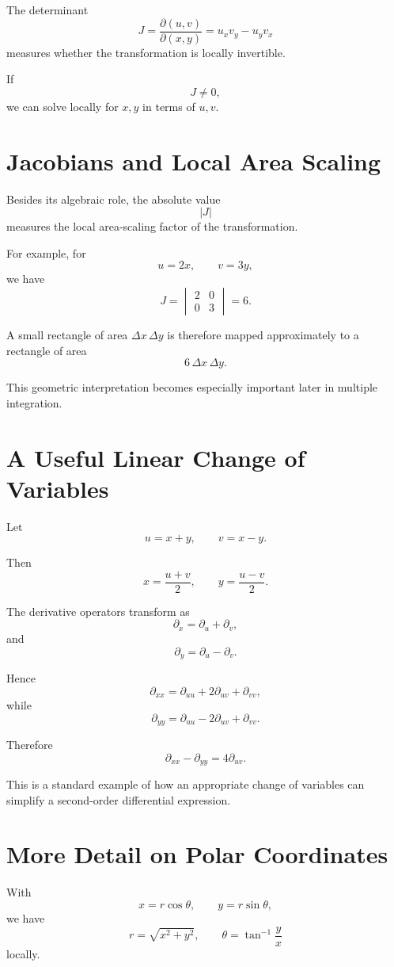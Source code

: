 \documentclass[11pt,oneside]{book}
\theoremstyle{studentthm}
\theoremstyle{definition}
\begin{document}
The determinant
\[
J
=
\frac{\partial(u,v)}{\partial(x,y)}
=
u_xv_y-u_yv_x
\]
measures whether the transformation is locally invertible.

If
\[
J\ne0,
\]
we can solve locally for \(x,y\) in terms of \(u,v\).

\section{Jacobians and Local Area Scaling}

Besides its algebraic role, the absolute value
\[
|J|
\]
measures the local area-scaling factor of the transformation.

For example, for
\[
u=2x,\qquad v=3y,
\]
we have
\[
J
=
\begin{vmatrix}
2&0\\
0&3
\end{vmatrix}
=6.
\]

A small rectangle of area \(\Delta x\,\Delta y\) is therefore mapped
approximately to a rectangle of area
\[
6\,\Delta x\,\Delta y.
\]

This geometric interpretation becomes especially important later in
multiple integration.

\section{A Useful Linear Change of Variables}

Let
\[
u=x+y,\qquad v=x-y.
\]

Then
\[
x=\frac{u+v}{2},
\qquad
y=\frac{u-v}{2}.
\]

The derivative operators transform as
\[
\partial_x=\partial_u+\partial_v,
\]
and
\[
\partial_y=\partial_u-\partial_v.
\]

Hence
\[
\partial_{xx}
=
\partial_{uu}
+
2\partial_{uv}
+
\partial_{vv},
\]
while
\[
\partial_{yy}
=
\partial_{uu}
-
2\partial_{uv}
+
\partial_{vv}.
\]

Therefore
\[
\partial_{xx}-\partial_{yy}
=
4\partial_{uv}.
\]

This is a standard example of how an appropriate change of variables
can simplify a second-order differential expression.

\section{More Detail on Polar Coordinates}

With
\[
x=r\cos\theta,
\qquad
y=r\sin\theta,
\]
we have
\[
r=\sqrt{x^2+y^2},
\qquad
\theta=\tan^{-1}\frac{y}{x}
\]
locally.
\end{document}
